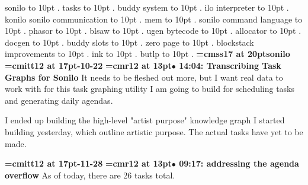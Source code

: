 
\pdfpagewidth=148mm
\pdfpageheight=210mm
\hsize=128mm
\vsize=190mm

\pdfhorigin=0pt
\pdfvorigin=0pt
\hoffset=10mm
\voffset=10mm
sonilo \leaders\hbox to 10pt {\hss.\hss}  \hfill {}
\smallskip
tasks \leaders\hbox to 10pt {\hss.\hss}  \hfill {}
\smallskip
buddy system \leaders\hbox to 10pt {\hss.\hss}  \hfill {}
\smallskip
ilo interpreter \leaders\hbox to 10pt {\hss.\hss}  \hfill {}
\smallskip
konilo sonilo communication \leaders\hbox to 10pt {\hss.\hss}  \hfill {}
\smallskip
mem \leaders\hbox to 10pt {\hss.\hss}  \hfill {}
\smallskip
sonilo command language \leaders\hbox to 10pt {\hss.\hss}  \hfill {}
\smallskip
phasor \leaders\hbox to 10pt {\hss.\hss}  \hfill {}
\smallskip
blsaw \leaders\hbox to 10pt {\hss.\hss}  \hfill {}
\smallskip
ugen bytecode \leaders\hbox to 10pt {\hss.\hss}  \hfill {}
\smallskip
allocator \leaders\hbox to 10pt {\hss.\hss}  \hfill {}
\smallskip
docgen \leaders\hbox to 10pt {\hss.\hss}  \hfill {}
\smallskip
buddy slots \leaders\hbox to 10pt {\hss.\hss}  \hfill {}
\smallskip
zero page \leaders\hbox to 10pt {\hss.\hss}  \hfill {}
\smallskip
blockstack improvements \leaders\hbox to 10pt {\hss.\hss}  \hfill {}
\smallskip
ink \leaders\hbox to 10pt {\hss.\hss}  \hfill {}
\smallskip
butlp \leaders\hbox to 10pt {\hss.\hss}  \hfill {}
\smallskip
\vfill \break
{}
{\medskip\noindent\bf\font\titlefont=cmss17 at 20pt\titlefont sonilo}\medskip
{\medskip\noindent\bf\font\titlefont=cmitt12 at 17pt-10-22}\medskip
{\smallskip\noindent\bf\font\titlefont=cmr12 at 13pt\titlefont $\bullet$ 14:04: Transcribing Task Graphs for Sonilo}\smallskip
It needs to be fleshed out more, but I want real data to work with for this task graphing utility I am going to build for scheduling tasks and generating daily agendas.
\par

I ended up building the high-level "artist purpose" knowledge graph I started building yesterday, which outline artistic purpose. The actual tasks have yet to be made.
\par

{\medskip\noindent\bf\font\titlefont=cmitt12 at 17pt-11-28}\medskip
{\smallskip\noindent\bf\font\titlefont=cmr12 at 13pt\titlefont $\bullet$ 09:17: addressing the agenda overflow}\smallskip
As of today, there are 26 tasks total.
\par

